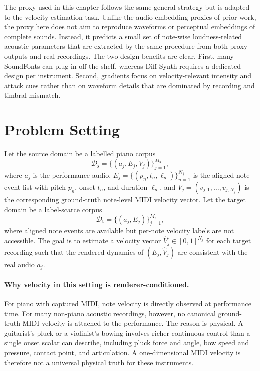 The proxy used in this chapter follows the same general strategy but is adapted to the velocity-estimation task. Unlike the audio-embedding proxies of prior work, the proxy here does not aim to reproduce waveforms or perceptual embeddings of complete sounds. Instead, it predicts a small set of note-wise loudness-related acoustic parameters that are extracted by the same procedure from both proxy outputs and real recordings. The two design benefits are clear. First, many SoundFonts can plug in off the shelf, whereas Diff-Synth requires a dedicated design per instrument. Second, gradients focus on velocity-relevant intensity and attack cues rather than on waveform details that are dominated by recording and timbral mismatch.

\section{Problem Setting}
\label{sec:bp:problem}

Let the source domain be a labelled piano corpus
\begin{equation}
\mathcal{D}_{\mathrm{s}} = \bigl\{(a_j, E_j, V_j)\bigr\}_{j=1}^{M_{\mathrm{s}}},
\label{eq:bp_source_domain}
\end{equation}
where $a_j$ is the performance audio, $E_j = \{(p_n, t_n, \ell_n)\}_{n=1}^{N_j}$ is the aligned note-event list with pitch $p_n$, onset $t_n$, and duration $\ell_n$, and $V_j = (v_{j,1}, \ldots, v_{j,N_j})$ is the corresponding ground-truth note-level MIDI velocity vector. Let the target domain be a label-scarce corpus
\begin{equation}
\mathcal{D}_{\mathrm{t}} = \bigl\{(a_j, E_j)\bigr\}_{j=1}^{M_{\mathrm{t}}},
\label{eq:bp_target_domain}
\end{equation}
where aligned note events are available but per-note velocity labels are not accessible. The goal is to estimate a velocity vector $\hat{V}_j \in [0,1]^{N_j}$ for each target recording such that the rendered dynamics of $(E_j, \hat{V}_j)$ are consistent with the real audio $a_j$.

\paragraph{Why velocity in this setting is renderer-conditioned.}
For piano with captured MIDI, note velocity is directly observed at performance time. For many non-piano acoustic recordings, however, no canonical ground-truth MIDI velocity is attached to the performance. The reason is physical. A guitarist's pluck or a violinist's bowing involves richer continuous control than a single onset scalar can describe, including pluck force and angle, bow speed and pressure, contact point, and articulation. A one-dimensional MIDI velocity is therefore not a universal physical truth for these instruments.

